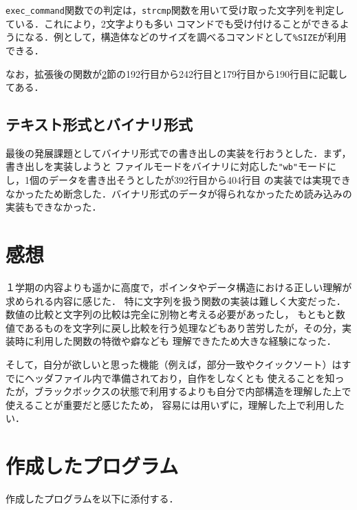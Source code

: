 \documentclass[a4j,11pt]{jarticle}
\begin{document}
\verb|exec_command|関数での判定は，\verb|strcmp|関数を用いて受け取った文字列を判定している．これにより，2文字よりも多い
コマンドでも受け付けることができるようになる．例として，構造体などのサイズを調べるコマンドとして\verb|%SIZE|が利用できる．

なお，拡張後の関数が\ref{sec:program}節の192行目から242行目と179行目から190行目に記載してある．

\subsection{テキスト形式とバイナリ形式}
最後の発展課題としてバイナリ形式での書き出しの実装を行おうとした．まず，書き出しを実装しようと
ファイルモードをバイナリに対応した\verb|"wb"|モードにし，1個のデータを書き出そうとしたが392行目から404行目
の実装では実現できなかったため断念した．バイナリ形式のデータが得られなかったため読み込みの実装もできなかった．

\section{感想}
１学期の内容よりも遥かに高度で，ポインタやデータ構造における正しい理解が求められる内容に感じた．
特に文字列を扱う関数の実装は難しく大変だった．数値の比較と文字列の比較は完全に別物と考える必要があったし，
もともと数値であるものを文字列に戻し比較を行う処理などもあり苦労したが，その分，実装時に利用した関数の特徴や癖なども
理解できたため大きな経験になった．

そして，自分が欲しいと思った機能（例えば，部分一致やクイックソート）はすでにヘッダファイル内で準備されており，自作をしなくとも
使えることを知ったが，ブラックボックスの状態で利用するよりも自分で内部構造を理解した上で使えることが重要だと感じたため，
容易には用いずに，理解した上で利用したい．
\section{作成したプログラム}\label{sec:program}

作成したプログラムを以下に添付する．
\end{document}
